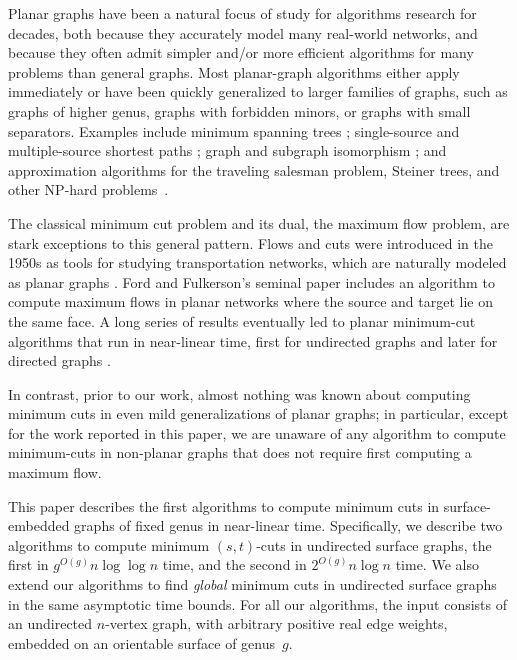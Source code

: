 \documentclass[letterpaper,review]{siamart190516}
\begin{document}
Planar graphs have been a natural focus of study for algorithms research for decades, both because
they accurately model many real-world networks, and because they often admit simpler and/or more
efficient algorithms for many problems than general graphs.  Most planar-graph algorithms either
apply immediately or have been quickly generalized to larger families of graphs, such as graphs of
higher genus, graphs with forbidden minors, or graphs with small separators.  Examples include
minimum spanning trees \cite{p-omst-99, m-tltam-04}; single-source and multiple-source shortest
paths \cite{cce-msspe-13, fr-pgnwe-06, hkrs-fspap-97, k-msspp-05, kmw-spdpg-09, lrt-gnd-79,
tm-spltm-09, efl-hmcpf-18}; graph and subgraph isomorphism \cite{g-itegd-00, hw-ltaip-74,
m-itgbg-80, e-sipgr-99, e-dtmcg-00}; and approximation algorithms for the traveling salesman
problem, Steiner trees, and other NP-hard problems~\cite{bdt-passp-14, bkk-ptass-07, bkk-stpg-07,
dhm-aacd-07, e-dtmcg-00, blw-mghls-17, gs-lsatw-02}.

The classical minimum cut problem and its dual, the maximum flow problem, are stark exceptions to this general pattern.  Flows and cuts were introduced in the 1950s as tools for studying transportation networks, which are naturally modeled as planar graphs \cite{hr-fmern-55}.  Ford and Fulkerson's seminal paper \cite{ff-mfn-56} includes an algorithm to compute maximum flows in planar networks where the source and target lie on the same face.  A long series of results eventually led to planar minimum-cut algorithms that run in near-linear time, first for undirected graphs \cite{r-mstcp-83, hj-oamfu-85, f-faspp-87, insw-iamcmf-11} and later for directed graphs \cite{jk-mcdpn-92, hkrs-fspap-97, mnnw-mdpgo-15}.

In contrast, prior to our work, almost nothing was known about computing minimum cuts in even mild generalizations of planar graphs; in particular, except for the work reported in this paper, we are unaware of any algorithm to compute minimum-cuts in non-planar graphs that does not require first computing a maximum flow.  

This paper describes the first algorithms to compute minimum cuts in surface-embedded graphs of fixed genus in near-linear time.  Specifically, we describe two algorithms to compute minimum $(s,t)$-cuts in undirected surface graphs, the first in $g^{O(g)} n\log\log n$ time, and the second in $2^{O(g)} n\log n$ time.
We also extend our  algorithms to find \emph{global} minimum cuts in undirected surface graphs in the same asymptotic time bounds.  For all our algorithms, the input consists of an undirected $n$-vertex graph, with arbitrary positive real edge weights, embedded on an orientable surface of genus~$g$.
\end{document}
